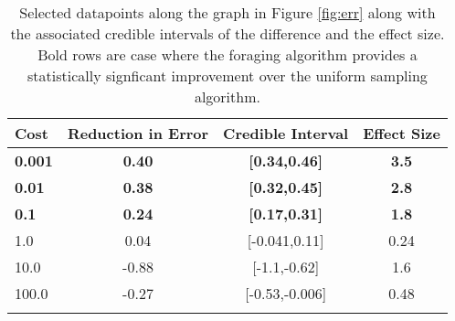 \begin{table}[htpd!]
	\centering
	\begin{tabular}{lccc}
		Cost & Reduction in Error & Credible Interval & Effect Size \\
		\hline
		\textbf{0.001} & \textbf{0.40} & \textbf{[0.34,0.46]} & \textbf{3.5}\\
		\textbf{0.01} & \textbf{0.38} & \textbf{[0.32,0.45]} & \textbf{2.8}\\
		\textbf{0.1} & \textbf{0.24} & \textbf{[0.17,0.31]} & \textbf{1.8}\\
		1.0 & 0.04 & [-0.041,0.11] & 0.24\\
		10.0 & -0.88 & [-1.1,-0.62] & 1.6\\
		100.0 & -0.27 & [-0.53,-0.006] & 0.48\\
		\hline \\
	\end{tabular}
	\caption{Selected datapoints along the graph in Figure \ref{fig:err} along with the associated credible intervals of the difference and the effect size.  Bold rows are case where the foraging algorithm provides a statistically signficant improvement over the uniform sampling algorithm.}
	\label{tbl:ttest}
\end{table}
